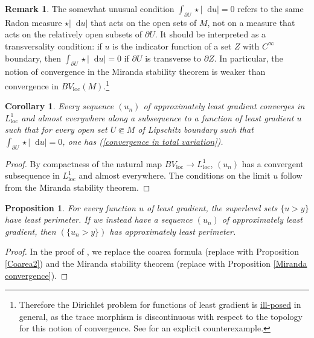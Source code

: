 \documentclass[reqno,10pt]{amsart}
\newcommand*\dif{\mathop{}\!\mathrm{d}}
\newcommand{\loc}{\mathrm{loc}}
\newtheorem{proposition}[theorem]{Proposition}
\newtheorem{corollary}[theorem]{Corollary}
\theoremstyle{definition}
\newtheorem{remark}[theorem]{Remark}
\numberwithin{equation}{section}
\begin{document}
\begin{remark}\label{transversality}
The somewhat unusual condition $\int_{\partial U} \star |\dif u| = 0$ refers to the same Radon measure $\star |\dif u|$ that acts on the open sets of $M$, not on a measure that acts on the relatively open subsets of $\partial U$.
It should be interpreted as a transversality condition: if $u$ is the indicator function of a set $Z$ with $C^\infty$ boundary, then $\int_{\partial U} \star |\dif u| = 0$ if $\partial U$ is transverse to $\partial Z$.
In particular, the notion of convergence in the Miranda stability theorem is weaker than convergence in $BV_\loc(M)$.\footnote{Therefore the Dirichlet problem for functions of least gradient is \underline{ill-posed} in general, as the trace morphism is discontinuous with respect to the topology for this notion of convergence. See \cite{spradlin2013traces} for an explicit counterexample.}
\end{remark}

\begin{corollary}\label{compactness}
Every sequence $(u_n)$ of approximately least gradient converges in $L^1_\loc$ and almost everywhere along a subsequence to a function of least gradient $u$ such that for every open set $U \Subset M$ of Lipschitz boundary such that $\int_{\partial U} \star |\dif u| = 0$, one has (\ref{convergence in total variation}).
\end{corollary}
\begin{proof}
By compactness of the natural map $BV_\loc \to L^1_\loc$, $(u_n)$ has a convergent subsequence in $L^1_\loc$ and almost everywhere.
The conditions on the limit $u$ follow from the Miranda stability theorem.
\end{proof}

\begin{proposition}\label{level sets are minimal}
For every function $u$ of least gradient, the superlevel sets $\{u > y\}$ have least perimeter.
If we instead have a sequence $(u_n)$ of approximately least gradient, then $(\{u_n > y\})$ has approximately least perimeter.
\end{proposition}
\begin{proof}
In the proof of \cite[Theorem 1]{BOMBIERI1969}, we replace the coarea formula (replace \cite[Theorem 1.6]{Miranda66} with Proposition \ref{Coarea2}) and the Miranda stability theorem (replace \cite[Teorema 3]{Miranda67} with Proposition \ref{Miranda convergence}).
\end{proof}
\end{document}
